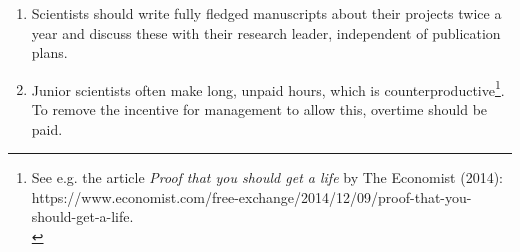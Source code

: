 \begin{enumerate}[nosep]
    \item 
    Scientists
    should write fully fledged manuscripts
    about their projects twice a year %
    and discuss these with their research leader,  
    independent of publication plans.   
    \item 
    Junior scientists often make long, unpaid hours, which is counterproductive\footnote{
        See e.g. the article \textit{Proof that you should get a life} by The Economist (2014): \\
        https://www.economist.com/free-exchange/2014/12/09/proof-that-you-should-get-a-life.\\ 
    }.
    To remove the incentive for management to allow this, overtime should be paid.

\end{enumerate}

